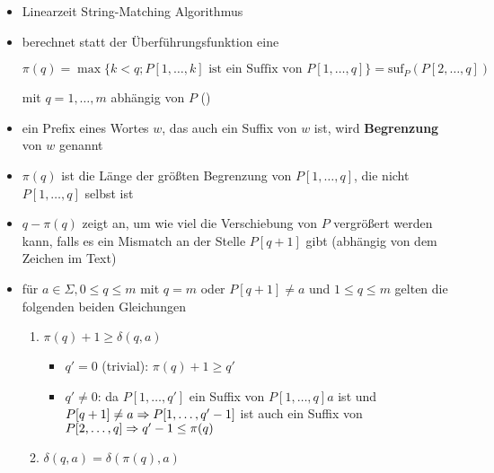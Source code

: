 \vspace*{-0.5\baselineskip}\begin{itemize}[itemsep=-2pt]
	\item Linearzeit String-Matching Algorithmus
	\item berechnet statt der Überführungsfunktion eine \textbf{\bound}
		\begin{center}
		$\pi(q) = \max\{k<q;P[1,\dots,k]\text{ ist ein Suffix von }P[1,\dots,q]\}=\text{suf}_P(P[2,\dots,q])$\end{center}
	mit $q=1,\dots,m$ abhängig von $P$ ()
	\item ein Prefix eines Wortes $w$, das auch ein Suffix von $w$ ist, wird \textbf{Begrenzung} von $w$ genannt
	\item $\pi(q)$ ist die Länge der größten Begrenzung von $P[1,\dots,q]$, die nicht $P[1,\dots,q]$ selbst ist
	\item $q-\pi(q)$ zeigt an, um wie viel die Verschiebung von $P$ vergrößert werden kann, falls es ein Mismatch an der Stelle $P[q+1]$ gibt (abhängig von dem Zeichen im Text)
	\item für $a\in \Sigma, 0\leq q\leq m$ mit $q=m$ oder $P[q+1]\neq a$ und $1\leq q\leq m$ gelten die folgenden beiden Gleichungen
		\begin{enumerate}
			\item $\pi(q)+1\geq \delta(q,a)$
				\vspace*{-1.5\baselineskip}\Proof\up
					\begin{itemize}
						\item $q'=0$ (trivial): $\pi(q)+1\geq q'$
						\item $q'\neq 0$: da $P[1,\dots,q']$ ein Suffix von $P[1,\dots,q]a$ ist und $P[q+1]\neq a\\
						\Rightarrow P[1,\dots,q'-1]$ ist auch ein Suffix von $P[2,\dots,q]\\
						\Rightarrow q'-1 \leq \pi(q)$
					\end{itemize}
			\item $\delta(q,a)=\delta(\pi(q),a)$
				\vspace*{-1.5\baselineskip}\Proof\up
\end{enumerate}
\end{itemize}
